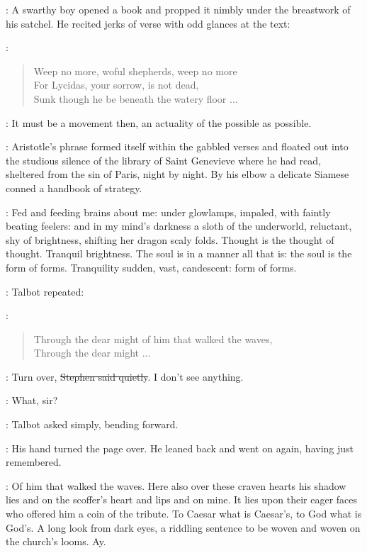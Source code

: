 :
A swarthy boy opened a book
and propped it nimbly under the breastwork of his satchel.
He recited jerks of verse with odd glances at the text:

\talbot:
\begin{verse}
    Weep no more, woful shepherds, weep no more \\
    For Lycidas, your sorrow, is not dead, \\
    Sunk though he be beneath the watery floor ...
\end{verse}

\StephenInt:
It must be a movement then, an actuality of the possible as possible.

:
Aristotle's phrase formed itself within the gabbled verses
and floated out into the studious silence of the library of Saint Genevieve
where he had read,
sheltered from the sin of Paris,
night by night.
By his elbow a delicate Siamese conned a handbook of strategy.

\StephenInt:
Fed and feeding brains about me:
under glowlamps, impaled, with faintly beating feelers:
and in my mind's darkness a sloth of the underworld,
reluctant, shy of brightness, shifting her dragon scaly folds.
Thought is the thought of thought.
Tranquil brightness.
The soul is in a manner all that is:
the soul is the form of forms.
Tranquility sudden, vast, candescent: form of forms.

:
Talbot repeated:

\begin{samepage}
\talbot:
\begin{verse}
    Through the dear might of him that walked the waves, \\
    Through the dear might ...
\end{verse}
\end{samepage}

\Stephen:
Turn over, \sout{Stephen said quietly}.
I don't see anything.

\talbot:
What, sir?

:
Talbot asked simply, bending forward.

:
His hand turned the page over.
He leaned back and went on again, having just remembered.

\StephenInt:
Of him that walked the waves.
Here also over these craven hearts his shadow lies
and on the scoffer's heart and lips and on mine.
It lies upon their eager faces who offered him a coin of the tribute.
To Caesar what is Caesar's, to God what is God's.
A long look from dark eyes,
a riddling sentence to be woven and woven on the church's looms.
Ay.

